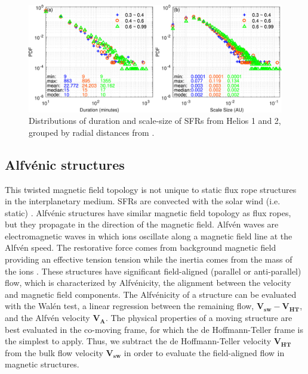 \begin{figure}
    \centering
    \includegraphics[width=\textwidth]{Figures/helios_Chen21.jpg}
    \caption[Distributions of scale-size of SFRs from Helios 1 and 2 \citep{ChenHu:2020}]{Distributions of duration and scale-size of SFRs from Helios 1 and 2, grouped by radial distances from \cite{ChenHu:2020}.}
    \label{fig:SFR-sizes}
\end{figure}




\subsection{Alfv\'enic structures}
This twisted magnetic field topology is not unique to static flux rope structures in the interplanetary medium. SFRs are convected with the solar wind (i.e. static) \citep{Cartwright:2008}. Alfv\'enic structures have similar magnetic field topology as flux ropes, but they propagate in the direction of the magnetic field. Alfv\'en waves are electromagnetic waves in which ions oscillate along a magnetic field line at the Alfv\'en speed. The restorative force comes from background magnetic field providing an effective tension tension while the inertia comes from the mass of the ions \citep{Alfven:1942}. These structures have significant field-aligned (parallel or anti-parallel) flow, which is characterized by Alfv\'enicity, the alignment between the velocity and magnetic field components.  
The Alfv\'enicity of a structure can be evaluated with the Wal\'en test, a linear regression between the remaining flow, $\mathbf{V_{sw}} - \mathbf{V_{HT}}$, and the Alfv\'en velocity $\mathbf{V_A}$. The physical properties of a moving structure are best evaluated in the co-moving frame, for which the de Hoffmann-Teller frame \citep{deHoffman-Teller:1950} is the simplest to apply. Thus, we subtract the de Hoffmann-Teller velocity $\mathbf{V_{HT}}$ from the bulk flow velocity $\mathbf{V_{sw}}$ in order to evaluate the field-aligned flow in magnetic structures.

